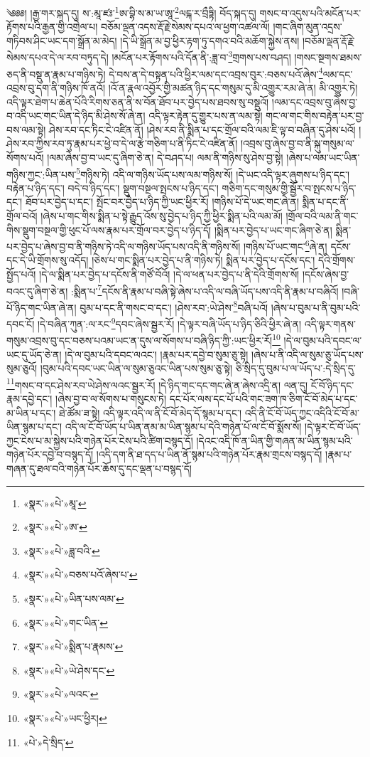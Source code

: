 ༄༅༅། །རྒྱ་གར་སྐད་དུ། ས་:མཱ་ཛཿ་\footnote{«སྣར་»«པེ་»མཱ་}ཨ་བྷི་ས་མ་ཡ་ཨཱ་\footnote{«སྣར་»«པེ་»ཨ་}ལངྐ་ར་བྲྀཏྟི། བོད་སྐད་དུ། གསང་བ་འདུས་པའི་མངོན་པར་རྟོགས་པའི་རྒྱན་གྱི་འགྲེལ་པ། བཅོམ་ལྡན་འདས་རྡོ་རྗེ་སེམས་དཔའ་ལ་ཕྱག་འཚལ་ལོ། །གང་ཞིག་མུན་འདྲས་གཏིབས་ཤིང་ཡང་དག་སྒྲོན་མ་མེད། །དེ་ཡི་སྒྲོན་མ་བྱ་ཕྱིར་རྟག་ཏུ་དགའ་བའི་མཆོག་སྐྱེས་ནས། །བཅོམ་ལྡན་རྡོ་རྗེ་སེམས་དཔའ་དེ་ལ་རབ་བཏུད་དེ། །མངོན་པར་རྟོགས་པའི་དོན་ནི་:ཟླ་བ་\footnote{«སྣར་»«པེ་»ཟླ་བའི་}གྲགས་པས་བཤད། །གསང་སྔགས་ཐམས་ཅད་ནི་བསྡུ་ན་རྣམ་པ་གཉིས་ཏེ། དེ་བས་ན་དེ་བསྟན་པའི་ཕྱིར་ལམ་དང་འབྲས་བུར་:བཅས་པའོ་ཞེས་\footnote{«སྣར་»«པེ་»བཅས་པའོ་ཞེས་པ་}ལམ་དང་འབྲས་བུ་དག་ནི་གཉིས་ཁོ་ནའོ། །འོ་ན་རྣལ་འབྱོར་གྱི་མཚན་ཉིད་དང་གསུམ་དུ་མི་འགྱུར་རམ་ཞེ་ན། མི་འགྱུར་ཏེ། འདི་ལྟར་ཐེག་པ་ཆེན་པོའི་རིགས་ཅན་ནི་ས་བོན་ཐོབ་པར་བྱེད་པས་ཐབས་སུ་བསྡུའོ། །ལམ་དང་འབྲས་བུ་ཞེས་བྱ་བ་འདི་ཡང་གང་ཡིན་དེ་ཉིད་མི་ཤེས་སོ་ཞེ་ན། འདི་ལྟར་རྟེན་དུ་གྱུར་པས་ན་ལམ་སྟེ། གང་ལ་གང་གིས་བརྟེན་པར་བྱ་བས་ལམ་སྟེ། ཤེས་རབ་དང་ཏིང་ངེ་འཛིན་ནོ། །ཤེས་རབ་ནི་སྨིན་པ་དང་གྲོལ་བའི་ལམ་ཇི་ལྟ་བ་བཞིན་དུ་ཤེས་པའོ། །ཤེས་རབ་ཀྱིས་རབ་ཏུ་རྣམ་པར་ཕྱེ་བ་དེ་ལ་རྩེ་གཅིག་པ་ནི་ཏིང་ངེ་འཛིན་ནོ། །འབྲས་བུ་ཞེས་བྱ་བ་ནི་སྐུ་གསུམ་ལ་སོགས་པའོ། །ལམ་ཞེས་བྱ་བ་ཡང་དུ་ཞིག་ཅེ་ན། དེ་བཤད་པ། ལམ་ནི་གཉིས་སུ་ཤེས་བྱ་སྟེ། །ཞེས་པ་ལམ་ཡང་ཡིན་གཉིས་ཀྱང་:ཡིན་པས་\footnote{«སྣར་»«པེ་»ཡིན་པས་ལམ་}གཉིས་ཏེ། འདི་ལ་གཉིས་ཡོད་པས་ལམ་གཉིས་སོ། །དེ་ཡང་འདི་ལྟར་ཞུགས་པ་ཉིད་དང་། བརྟེན་པ་ཉིད་དང་། བདེ་བ་ཉིད་དང་། སྡུག་བསྔལ་སྤངས་པ་ཉིད་དང་། གཅིག་དང་གསུམ་གྱི་སྦྱོར་བ་སྤངས་པ་ཉིད་དང་། ཐོབ་པར་བྱེད་པ་དང་། སྤོང་བར་བྱེད་པ་ཉིད་ཀྱི་ཡང་ཕྱིར་རོ། །གཉིས་པོ་དེ་ཡང་གང་ཞེ་ན། སྨིན་པ་དང་ནི་གྲོལ་བའོ། །ཞེས་པ་གང་གིས་སྨིན་པ་སྟེ་རྒྱུད་འོས་སུ་བྱེད་པ་ཉིད་ཀྱི་ཕྱིར་སྨིན་པའི་ལམ་མོ། །གྲོལ་བའི་ལམ་ནི་གང་གིས་སྡུག་བསྔལ་གྱི་ཕུང་པོ་ལས་རྣམ་པར་གྲོལ་བར་བྱེད་པ་ཉིད་དོ། །སྨིན་པར་བྱེད་པ་ཡང་གང་ཞིག་ཅེ་ན། སྨིན་པར་བྱེད་པ་ཞེས་བྱ་བ་ནི་གཉིས་ཏེ་འདི་ལ་གཉིས་ཡོད་པས་འདི་ནི་གཉིས་སོ། །གཉིས་པོ་ཡང་གང་\footnote{«སྣར་»«པེ་»གང་ཡིན་}ཞེ་ན། དངོས་དང་དེ་ཡི་གྲོགས་སུ་འདོད། །ཅེས་པ་གང་སྨིན་པར་བྱེད་པ་ནི་གཉིས་ཏེ། སྨིན་པར་བྱེད་པ་དངོས་དང་། དེའི་གྲོགས་སྤྱོད་པའོ། །དེ་ལ་སྨིན་པར་བྱེད་པ་དངོས་ནི་གཙོ་བོའོ། །དེ་ལ་ཕན་པར་བྱེད་པ་ནི་དེའི་གྲོགས་སོ། །དངོས་ཞེས་བྱ་བའང་དུ་ཞིག་ཅེ་ན། :སྨིན་པ་\footnote{«སྣར་»«པེ་»སྨིན་པ་རྣམས་}དངོས་ནི་རྣམ་པ་བཞི་སྟེ་ཞེས་པ་འདི་ལ་བཞི་ཡོད་པས་འདི་ནི་རྣམ་པ་བཞིའོ། །བཞི་པོ་ཉིད་གང་ཡིན་ཞེ་ན། བུམ་པ་དང་ནི་གསང་བ་དང་། །ཤེས་རབ་:ཡེ་ཤེས་\footnote{«སྣར་»«པེ་»ཡེ་ཤེས་དང་}བཞི་པའོ། །ཞེས་པ་བུམ་པ་ནི་བུམ་པའི་དབང་ངོ། །དེ་བཞིན་ཀུན་:ལ་རང་\footnote{«སྣར་»«པེ་»ལའང་}དབང་ཞེས་སྦྱར་རོ། །དེ་ལྟར་བཞི་ཡོད་པ་ཉིད་ཅིའི་ཕྱིར་ཞེ་ན། འདི་ལྟར་གནས་གསུམ་འབྲས་བུ་དང་བཅས་པའམ་ཡང་ན་དུས་ལ་སོགས་པ་བཞི་ཉིད་ཀྱི་:ཡང་ཕྱིར་རོ།\footnote{«སྣར་»«པེ་»ཡང་ཕྱིར།} །དེ་ལ་བུམ་པའི་དབང་ལ་ཡང་དུ་ཡོད་ཅེ་ན། །དེ་ལ་བུམ་པའི་དབང་ལའང་། །རྣམ་པར་དབྱེ་བ་སུམ་ཅུ་སྟེ། །ཞེས་པ་ནི་འདི་ལ་སུམ་ཅུ་ཡོད་པས་སུམ་ཅུའོ། །བུམ་པའི་དབང་ཡང་ཡིན་ལ་སུམ་ཅུའང་ཡིན་པས་སུམ་ཅུ་སྟེ། ཅི་སྲིད་དུ་བུམ་པ་ལ་ཡོད་པ་:དེ་སྲིད་དུ་\footnote{«པེ་»དེ་སྲིད་}གསང་བ་དང་ཤེས་རབ་ཡེ་ཤེས་ལའང་སྦྱར་རོ། །དེ་ཉིད་གང་དང་གང་ཞེ་ན་ཞེས་འདྲི་ན། ལན་དུ། ངོ་བོ་ཉིད་དང་རྣམ་དབྱེ་དང་། །ཞེས་བྱ་བ་ལ་སོགས་པ་གསུངས་ཏེ། དང་པོར་ལས་དང་པོ་པའི་གང་ཟག་ཁ་ཅིག་ངོ་བོ་མེད་པ་དང་མ་ཡིན་པ་དང་། ཐེ་ཚོམ་ཟ་སྟེ། འདི་ལྟར་འདི་ལ་ནི་ངོ་བོ་མེད་དོ་སྙམ་པ་དང་། འདི་ནི་ངོ་བོ་ཡོད་ཀྱང་འདིའི་ངོ་བོ་མ་ཡིན་སྙམ་པ་དང་། འདི་ལ་ངོ་བོ་ཡོད་པ་ཡིན་ནམ་མ་ཡིན་སྙམ་པ་དེའི་གཉེན་པོ་ལ་ངོ་བོ་སྨོས་སོ། །དེ་ལྟར་ངོ་བོ་ཡོད་ཀྱང་ངེས་པ་མ་སྐྱེས་པའི་གཉེན་པོར་ངེས་པའི་ཚིག་བསྙད་དོ། །དེའང་འདི་ཁོ་ན་ཡིན་གྱི་གཞན་མ་ཡིན་སྙམ་པའི་གཉེན་པོར་དབྱེ་བ་བསྙད་དོ། །འདི་དག་ནི་ཐ་དད་པ་ཡིན་ནོ་སྙམ་པའི་གཉེན་པོར་རྣམ་གྲངས་བསྙད་དོ། །རྣམ་པ་གཞན་དུ་ཐལ་བའི་གཉེན་པོར་ཆོས་དུ་དང་ལྡན་པ་བསྙད་དོ། 